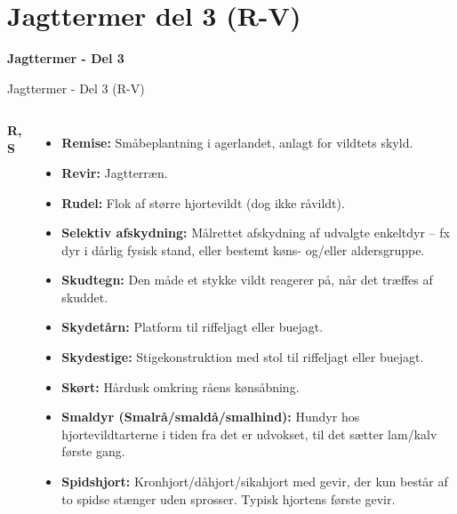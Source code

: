 \section{Jagttermer del 3 (R-V)}

\begin{frame}
  \vspace{3em}
  \begin{center}
    {\LARGE \textbf{Jagttermer - Del 3}
    }
    \\
    \vspace{1em}
  \end{center}
\end{frame}

\begin{frame}{Jagttermer - Del 3 (R-V)}

\vspace{0.3em} %

\begin{columns}[T]
    \textbf{\large R, S}
    \setlength{\parskip}{0.1em} %
    \scriptsize %
    \RaggedRight
    \begin{itemize}
        \item \textbf{Remise:} Småbeplantning i agerlandet, anlagt for vildtets skyld.
        \item \textbf{Revir:} Jagtterræn.
        \item \textbf{Rudel:} Flok af større hjortevildt (dog ikke råvildt).
        \item \textbf{Selektiv afskydning:} Målrettet afskydning af udvalgte enkeltdyr – fx dyr i dårlig fysisk stand, eller bestemt køns- og/eller aldersgruppe.
        \item \textbf{Skudtegn:} Den måde et stykke vildt reagerer på, når det træffes af skuddet.
        \item \textbf{Skydetårn:} Platform til riffeljagt eller buejagt.
        \item \textbf{Skydestige:} Stigekonstruktion med stol til riffeljagt eller buejagt.
        \item \textbf{Skørt:} Hårdusk omkring råens kønsåbning.
        \item \textbf{Smaldyr (Smalrå/smaldå/smalhind):} Hundyr hos hjortevildtarterne i tiden fra det er udvokset, til det sætter lam/kalv første gang.
        \item \textbf{Spidshjort:} Kronhjort/dåhjort/sikahjort med gevir, der kun består af to spidse stænger uden sprosser. Typisk hjortens første gevir.
    \end{itemize}


\end{columns}
\end{frame}
